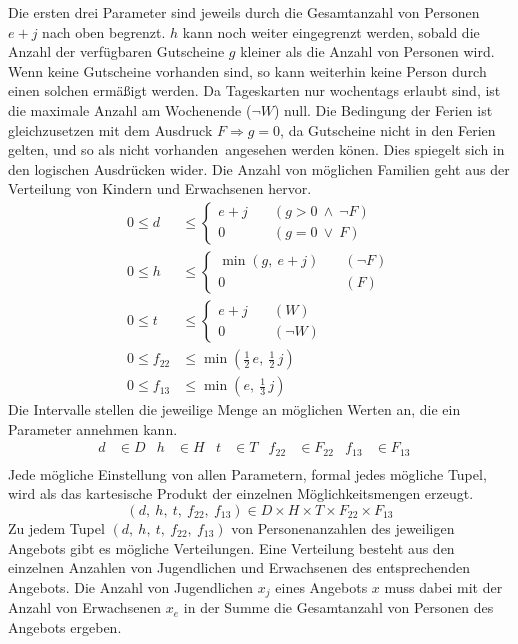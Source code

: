 \documentclass[a4paper, 12pt]{scrartcl}
\begin{document}
Die ersten drei Parameter sind jeweils durch die Gesamtanzahl von Personen $e+j$ nach oben begrenzt. $h$ kann noch weiter eingegrenzt werden, sobald die Anzahl der verfügbaren Gutscheine $g$ kleiner als die Anzahl von Personen wird. Wenn keine Gutscheine vorhanden sind, so kann weiterhin keine Person durch einen solchen ermäßigt werden. Da Tageskarten nur wochentags erlaubt sind, ist die maximale Anzahl am Wochenende ($\neg W$) null. Die Bedingung der Ferien ist gleichzusetzen mit dem Ausdruck $F \Rightarrow g = 0$, da Gutscheine nicht in den Ferien gelten, und so als \glqq nicht vorhanden\grqq\ angesehen werden könen. Dies spiegelt sich in den logischen Ausdrücken wider. Die Anzahl von möglichen Familien geht aus der Verteilung von Kindern und Erwachsenen hervor.
\begin{align*}
	0 \le d &\le \begin{cases} e+j &\quad (g > 0 \:\wedge\: \neg F) \\ 0 &\quad (g = 0 \:\vee\: F) \end{cases} \\
	0 \le h &\le \begin{cases} \min(g,\ e+j) &\quad (\neg F) \\ 0 &\quad (F) \end{cases} \\
	0 \le t &\le \begin{cases} e + j &\quad (W) \\ 0 &\quad(\neg W)\end{cases} \\
	0 \le f_{22} &\le \min \left( \frac{1}{2}\,e,\ \frac{1}{2}\,j \right) \\
	0 \le f_{13} &\le \min \left( e,\ \frac{1}{3}\,j \right)
\end{align*}
Die Intervalle stellen die jeweilige Menge an möglichen Werten an, die ein Parameter annehmen kann.
\begin{align*}
	d &\in D &
	h &\in H &
	t &\in T &
	f_{22} &\in F_{22} &
	f_{13} &\in F_{13} & \\
\end{align*}
Jede mögliche Einstellung von allen Parametern, formal jedes mögliche Tupel, wird als das kartesische Produkt der einzelnen Möglichkeitsmengen erzeugt.
\[ (d,\ h,\ t,\ f_{22},\ f_{13}) \in D \times H \times T \times F_{22} \times F_{13}\]
Zu jedem Tupel $(d,\ h,\ t,\ f_{22},\ f_{13})$ von Personenanzahlen des jeweiligen Angebots gibt es mögliche Verteilungen. Eine Verteilung besteht aus den einzelnen Anzahlen von Jugendlichen und Erwachsenen des entsprechenden Angebots. Die Anzahl von Jugendlichen $x_j$ eines Angebots $x$ muss dabei mit der Anzahl von Erwachsenen $x_e$ in der Summe die Gesamtanzahl von Personen des Angebots ergeben. 
\end{document}
